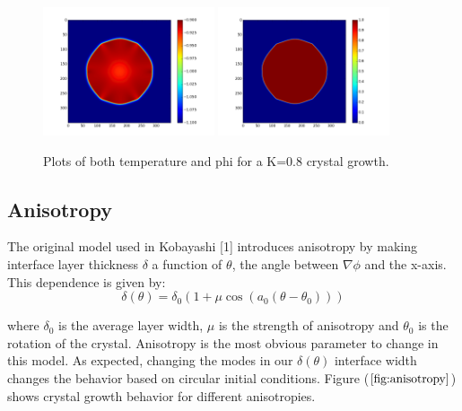 \documentclass[10pt]{article} %
\begin{document}
\begin{figure}[h!]
  \centering
  \includegraphics[width=0.45\textwidth]{../u-cold-field-3.png}
  \includegraphics[width=0.45\textwidth]{../phi-cold-field-3.png}
  \caption{Plots of both temperature and phi for a K=0.8 crystal growth.}
  \label{fig:latent-heat-cold}
\end{figure}

\subsection{Anisotropy}
The original model used in Kobayashi [1] introduces anisotropy by making interface layer thickness $\delta$ a function of $\theta$, the angle between $\nabla\phi$ and the x-axis. This dependence is given by:\\

\begin{equation}
  \delta(\theta) = \delta_0(1 + \mu\cos(a_0(\theta-\theta_0)))
  \label{eq:kobayoshi-delta}
\end{equation}

where $\delta_0$ is the average layer width, $\mu$ is the strength of anisotropy and $\theta_0$ is the rotation of the crystal. Anisotropy is the most obvious parameter to change in this model. As expected, changing the modes in our $\delta(\theta)$ interface width changes the behavior based on circular initial conditions. Figure ($\ref{fig:anisotropy}$) shows crystal growth behavior for different anisotropies.\\
\end{document}
